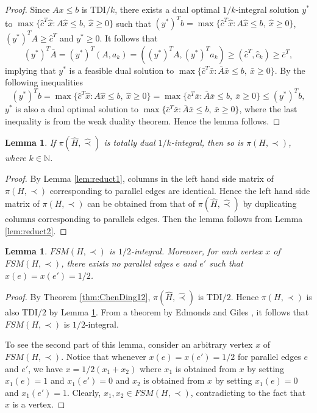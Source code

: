 \documentclass[11pt]{article}
\newtheorem{lemma}[theorem]{Lemma}
\numberwithin{theorem}{section}
\begin{document}
\begin{proof}
Since $Ax\leq b$ is TDI$/k$, there exists a dual optimal $1/k$-integral solution $y^*$ to $\max\{\hat{c}^T\hat{x}:A\hat{x}\leq b,~\hat{x}\geq 0\}$ such that $(y^*)^T b=\max\{\hat{c}^T \hat{x}:A\hat{x}\leq b,~\hat{x}\geq 0\}$, $(y^*)^T A\geq \hat{c}^T$ and $y^*\geq 0$. It follows that
\begin{equation*}
(y^*)^T \bar{A}=(y^*)^T (A,a_k)=((y^*)^T A,(y^*)^T a_k)\geq (\hat{c}^T,\hat{c}_k)\geq\bar{c}^T,
\end{equation*}
implying that $y^*$ is a feasible dual solution to $\max\{\bar{c}^T \bar{x}:\bar{A}\bar{x}\leq b,~\bar{x}\geq 0\}$. By the following inequalities
\begin{equation*}
(y^*)^T b=\max\{\hat{c}^T \hat{x}:A\hat{x}\leq b,~\hat{x}\geq 0\}=\max\{\bar{c}^T \bar{x}:\bar{A}\bar{x}\leq b,~\bar{x}\geq 0\}\leq (y^*)^T b,
\end{equation*} $y^*$ is also a dual optimal solution to $\max\{\bar{c}^T \bar{x}:\bar{A}\bar{x}\leq b,~\bar{x}\geq 0\}$, where the last inequality is from the weak duality theorem. Hence the lemma follows.
\end{proof}

\begin{lemma}
\label{lem:reduct3}
If $\pi(\hat{H},\hat\prec)$ is totally dual $1/k$-integral, then so is $\pi(H,\prec)$, where $k\in\mathbb{N}$.
\end{lemma}
\begin{proof}
By Lemma \ref{lem:reduct1}, columns in the left hand side matrix of $\pi(H,\prec)$ corresponding to parallel edges are identical. Hence the left hand side matrix of $\pi(H,\prec)$ can be obtained from that of $\pi(\hat{H},\hat\prec)$ by duplicating columns corresponding to parallels edges. Then the lemma follows from Lemma \ref{lem:reduct2}.
\end{proof}

\begin{lemma}
\label{lem:reduct4}
$FSM(H,\prec)$ is $1/2$-integral. Moreover, for each vertex $x$ of $FSM(H,\prec)$, there exists no parallel edges $e$ and $e'$ such that $x(e)=x(e')=1/2$.
\end{lemma}
\begin{proof}
By Theorem \ref{thm:ChenDing12}, $\pi(\hat{H},\hat\prec)$ is TDI$/2$. Hence $\pi(H,\prec)$ is also TDI$/2$ by Lemma \ref{lem:reduct3}. From a theorem by Edmonds and Giles \cite{EdmoGile77}, it follows that $FSM(H,\prec)$ is $1/2$-integral.

To see the second part of this lemma, consider an arbitrary vertex $x$ of $FSM(H,\prec)$. Notice that whenever $x(e)=x(e')=1/2$ for parallel edges $e$ and $e'$, we have $x=1/2 (x_1 + x_2)$ where $x_1$ is obtained from $x$ by setting $x_1 (e)=1$ and $x_1 (e')=0$ and $x_2$ is obtained from $x$ by setting $x_1 (e)=0$ and $x_1 (e')=1$. Clearly, $x_1, x_2\in FSM(H,\prec)$, contradicting to the fact that $x$ is a vertex.
\end{proof}
\end{document}
